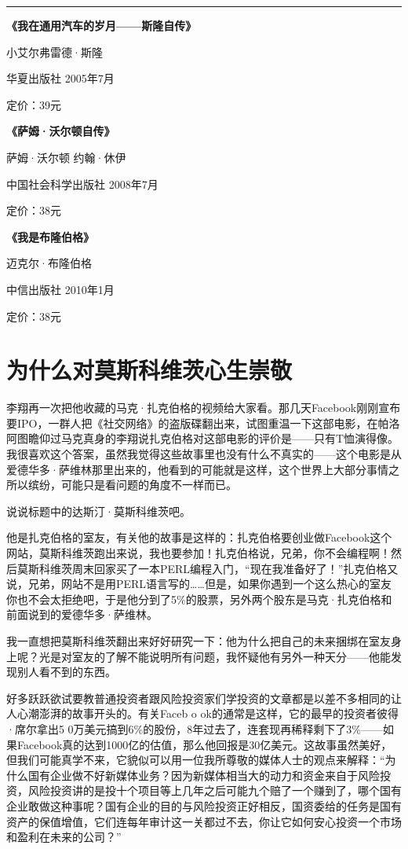 \begin{center}\rule{3in}{0.4pt}\end{center}

\textbf{《我在通用汽车的岁月------斯隆自传》}

小艾尔弗雷德·斯隆

华夏出版社 2005年7月

定价：39元

\textbf{《萨姆·沃尔顿自传》}

萨姆·沃尔顿 约翰·休伊

中国社会科学出版社 2008年7月

定价：38元

\textbf{《我是布隆伯格》}

迈克尔·布隆伯格

中信出版社 2010年1月

定价：38元

\section{为什么对莫斯科维茨心生崇敬}

李翔再一次把他收藏的马克·扎克伯格的视频给大家看。那几天Facebook刚刚宣布要IPO，一群人把《社交网络》的盗版碟翻出来，试图重温一下这部电影，在帕洛阿图瞻仰过马克真身的李翔说扎克伯格对这部电影的评价是------只有T恤演得像。我很喜欢这个答案，虽然我觉得这些故事里也没有什么不真实的------这个电影是从爱德华多·萨维林那里出来的，他看到的可能就是这样，这个世界上大部分事情之所以缤纷，可能只是看问题的角度不一样而已。

说说标题中的达斯汀·莫斯科维茨吧。

他是扎克伯格的室友，有关他的故事是这样的：扎克伯格要创业做Facebook这个网站，莫斯科维茨跑出来说，我也要参加！扎克伯格说，兄弟，你不会编程啊！然后莫斯科维茨周末回家买了一本PERL编程入门，``现在我准备好了！''扎克伯格又说，兄弟，网站不是用PERL语言写的\ldots{}\ldots{}但是，如果你遇到一个这么热心的室友你也不会太拒绝吧，于是他分到了5\%的股票，另外两个股东是马克·扎克伯格和前面说到的爱德华多·萨维林。

我一直想把莫斯科维茨翻出来好好研究一下：他为什么把自己的未来捆绑在室友身上呢？光是对室友的了解不能说明所有问题，我怀疑他有另外一种天分------他能发现别人看不到的东西。

好多跃跃欲试要教普通投资者跟风险投资家们学投资的文章都是以差不多相同的让人心潮澎湃的故事开头的。有关Faceb
o ok的通常是这样，它的最早的投资者彼得·席尔拿出5
0万美元搞到6\%的股份，8年过去了，连套现再稀释剩下了3\%------如果Facebook真的达到1000亿的估值，那么他回报是30亿美元。这故事虽然美好，但我们可能真学不来，它貌似可以用一位我所尊敬的媒体人士的观点来解释：``为什么国有企业做不好新媒体业务？因为新媒体相当大的动力和资金来自于风险投资，风险投资讲的是投十个项目等上几年之后可能九个赔了一个赚到了，哪个国有企业敢做这种事呢？国有企业的目的与风险投资正好相反，国资委给的任务是国有资产的保值增值，它们连每年审计这一关都过不去，你让它如何安心投资一个市场和盈利在未来的公司？''

